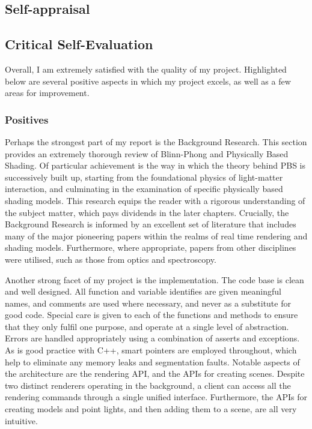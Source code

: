 \begin{appendices}

%
%
\chapter{Self-appraisal}

\section{Critical Self-Evaluation}

Overall, I am extremely satisfied with the quality of my project. Highlighted below are several positive aspects in which my project excels, as well as a few areas for improvement.

\subsection{Positives}

Perhaps the strongest part of my report is the Background Research. This section provides an extremely thorough review of Blinn-Phong and Physically Based Shading. Of particular achievement is the way in which the theory behind PBS is successively built up, starting from the foundational physics of light-matter interaction, and culminating in the examination of specific physically based shading models. This research equips the reader with a rigorous understanding of the subject matter, which pays dividends in the later chapters. Crucially, the Background Research is informed by an excellent set of literature that includes many of the major pioneering papers within the realms of real time rendering and shading models. Furthermore, where appropriate, papers from other disciplines were utilised, such as those from optics and spectroscopy.

Another strong facet of my project is the implementation. The code base is clean and well designed. All function and variable identifies are given meaningful names, and comments are used where necessary, and never as a substitute for good code. Special care is given to each of the functions and methods to ensure that they only fulfil one purpose, and operate at a single level of abstraction. Errors are handled appropriately using a combination of asserts and exceptions. As is good practice with C++, smart pointers are employed throughout, which help to eliminate any memory leaks and segmentation faults. Notable aspects of the architecture are the rendering API, and the APIs for creating scenes. Despite two distinct renderers operating in the background, a client can access all the rendering commands through a single unified interface. Furthermore, the APIs for creating models and point lights, and then adding them to a scene, are all very intuitive.


\end{appendices}
